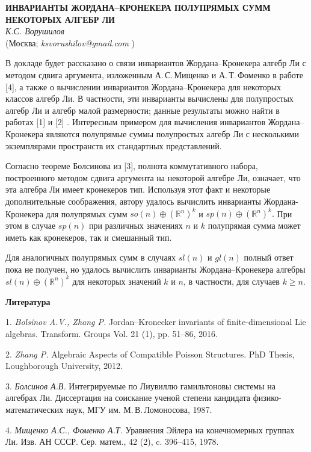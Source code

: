 \begin{center}{ \bf  ИНВАРИАНТЫ ЖОРДАНА--КРОНЕКЕРА ПОЛУПРЯМЫХ СУММ НЕКОТОРЫХ АЛГЕБР ЛИ}\\
{\it К.С. Ворушилов } \\
(Москва; {\it ksvorushilov@gmail.com} )
\end{center}

В докладе будет рассказано о связи инвариантов Жорда\-на--Кронекера алгебр Ли с методом сдвига аргумента, изложенным А.\,С.\,Мищенко и А.\,Т.\,Фоменко в работе [4], а также о вычислении инвариантов Жордана--Кронекера для некоторых классов алгебр Ли. В частности, эти инварианты вычислены для полупростых алгебр Ли и алгебр малой размерности; данные результаты можно найти в работах [1] и [2] . Интересным примером для вычисления инвариантов Жордана--Кронекера являются полупрямые суммы полупростых алгебр Ли с несколькими экземплярами пространств их стандартных представлений.

Согласно теореме Болсинова из [3], полнота коммутативного набора, построенного методом сдвига аргумента на некоторой алгебре Ли, означает, что эта алгебра Ли имеет кронекеров тип. Используя этот факт и некоторые дополнительные соображения, автору удалось вычислить инварианты Жордана-Кронекера для полупрямых сумм  $so(n)\oplus (\mathbb{R}^n)^k$ и  $sp(n)\oplus (\mathbb{R}^n)^k.$ При этом в случае $sp(n)$ при различных значениях $n$ и $k$ полупрямая сумма может иметь как кронекеров, так и смешанный тип.

Для аналогичных полупрямых сумм в случаях $sl(n)$ и $gl(n)$ полный ответ пока не получен, но удалось вычислить инварианты Жордана--Кронекера алгебры $sl(n)\oplus (\mathbb{R}^n)^k$ для некоторых значений $k$ и $n$, в частности, для случаев $k\geq n.$



\smallskip \centerline{\bf Литература}\nopagebreak

1. {\it Bolsinov A.V., Zhang P.} Jordan–Kronecker invariants of finite-dimensional Lie algebras. Transform. Groups Vol. 21 (1), pp. 51--86, 2016.

2. {\it Zhang P.} Algebraic Aspects of Compatible Poisson Struc\-tures. PhD Thesis, Loughborough University, 2012.


3. {\it Болсинов А.В.} Интегрируемые по Лиувиллю гамильтоновы системы на алгебрах Ли. Диссертация на соискание ученой степени кандидата физико-математических наук, МГУ им. М.\,В.\,Ломоносова, 1987.

4. {\it Мищенко А.С., Фоменко А.Т.} Уравнения Эйлера на конечномерных группах Ли. Изв. АН СССР. Сер. матем., 42 (2), c. 396–415, 1978.


